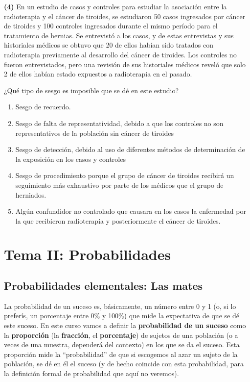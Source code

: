 \documentclass[
]{book}
\providecommand{\tightlist}{%
  \setlength{\itemsep}{0pt}\setlength{\parskip}{0pt}}
\theoremstyle{definition}
\theoremstyle{definition}
\theoremstyle{definition}
\theoremstyle{definition}
\theoremstyle{remark}
\begin{document}
\textbf{(4)} En un estudio de casos y controles para estudiar la asociación entre la radioterapia y el cáncer de tiroides, se estudiaron 50 casos ingresados por cáncer de tiroides y 100 controles ingresados durante el mismo período para el tratamiento de hernias. Se entrevistó a los casos, y de estas entrevistas y sus historiales médicos se obtuvo que 20 de ellos habían sido tratados con radioterapia previamente al desarrollo del cáncer de tiroides. Los controles no fueron entrevistados, pero una revisión de sus historiales médicos reveló que solo 2 de ellos habían estado expuestos a radioterapia en el pasado.

¿Qué tipo de sesgo es imposible que se dé en este estudio?

\begin{enumerate}
\def\labelenumi{\arabic{enumi}.}
\tightlist
\item
  Sesgo de recuerdo.
\item
  Sesgo de falta de representatividad, debido a que los controles no son representativos de la población sin cáncer de tiroides
\item
  Sesgo de detección, debido al uso de diferentes métodos de determinación de la exposición en los casos y controles
\item
  Sesgo de procedimiento porque el grupo de cáncer de tiroides recibirá un seguimiento más exhaustivo por parte de los médicos que el grupo de herniados.
\item
  Algún confundidor no controlado que causara en los casos la enfermedad por la que recibieron radioterapia y posteriormente el cáncer de tiroides.
\end{enumerate}

\hypertarget{part-tema-ii-probabilidades}{%
\part*{Tema II: Probabilidades}\label{part-tema-ii-probabilidades}}

\hypertarget{probabilidades-elementales-las-mates}{%
\chapter{Probabilidades elementales: Las mates}\label{probabilidades-elementales-las-mates}}

La probabilidad de un suceso es, básicamente, un número entre 0 y 1 (o, si lo preferís, un porcentaje entre 0\% y 100\%) que mide la expectativa de que se dé este suceso. En este curso vamos a definir la \textbf{probabilidad de un suceso} como la \textbf{proporción} (la \textbf{fracción}, el \textbf{porcentaje}) de sujetos de una población (o a veces de una muestra, dependerá del contexto) en los que se da el suceso. Esta proporción mide la ``probabilidad'' de que si escogemos al azar un sujeto de la población, se dé en él el suceso (y de hecho coincide con esta probabilidad, para la definición formal de probabilidad que aquí no veremos).
\end{document}
